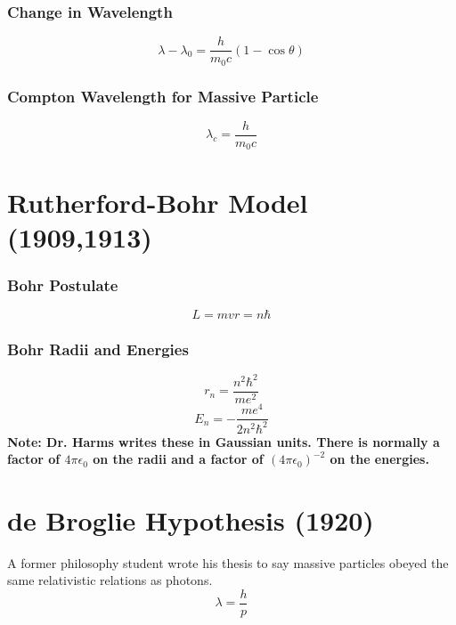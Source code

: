 \subsubsection{Change in Wavelength}
\begin{equation} \label{eq:compton-change}
    \lambda - \lambda_0 = \frac{h}{m_0c}(1-\cos{\theta})
\end{equation}
\subsubsection{Compton Wavelength for Massive Particle}
\begin{equation} \label{eq:compton-wavelength}
    \lambda_c = \frac{h}{m_0c}
\end{equation}

\section{Rutherford-Bohr Model (1909,1913)}
\subsubsection{Bohr Postulate}
\begin{equation} \label{eq:bohr-postulate}
    L = mvr = n\hbar
\end{equation}

\subsubsection{Bohr Radii and Energies}
\begin{equation}\label{eq:bohr-radii}
    r_n = \frac{n^2\hbar^2}{me^2}
\end{equation}
\begin{equation}\label{eq:bohr-energies}
    E_n = - \frac{me^4}{2n^2\hbar^2}
\end{equation}
\textbf{Note: Dr. Harms writes these in Gaussian units. There is normally a factor of $4\pi\epsilon_0$ on the radii and a factor of $(4\pi\epsilon_0)^{-2}$ on the energies.}

\section{de Broglie Hypothesis (1920)}
A former philosophy student wrote his thesis to say massive particles obeyed the same relativistic relations as photons.
\begin{equation} \label{eq:debroglie}
    \lambda = \frac{h}{p}
\end{equation}




